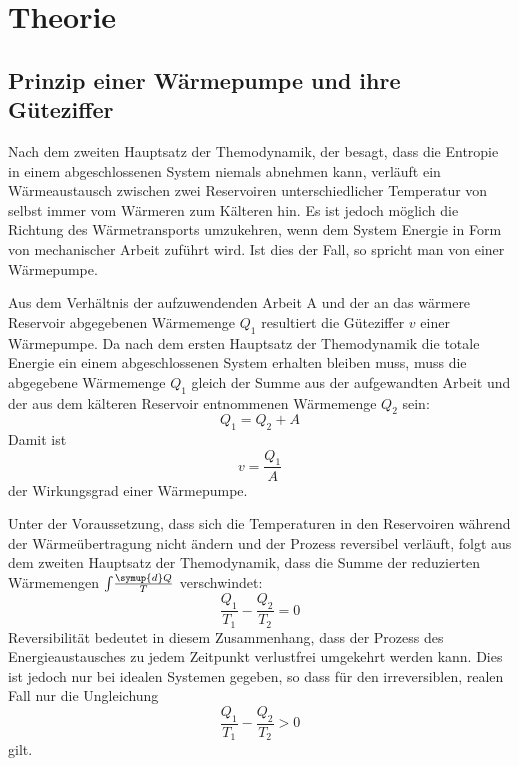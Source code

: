 \section{Theorie}
\label{sec:Theorie}
  \subsection{Prinzip einer Wärmepumpe und ihre Güteziffer}
  Nach dem zweiten Hauptsatz der Themodynamik, der besagt, dass die Entropie in
  einem abgeschlossenen System niemals abnehmen kann, verläuft ein Wärmeaustausch
  zwischen zwei Reservoiren unterschiedlicher Temperatur von selbst immer vom
  Wärmeren zum Kälteren hin.
  Es ist jedoch möglich die Richtung des Wärmetransports umzukehren, wenn dem
  System Energie in Form von mechanischer Arbeit zuführt wird. Ist dies der Fall,
  so spricht man von einer Wärmepumpe.

  Aus dem Verhältnis der aufzuwendenden Arbeit A und der an das wärmere Reservoir
  abgegebenen Wärmemenge $Q_1$ resultiert die Güteziffer $v$ einer Wärmepumpe.
  Da nach dem ersten Hauptsatz der Themodynamik die totale Energie ein einem
  abgeschlossenen System erhalten bleiben muss, muss die abgegebene Wärmemenge
  $Q_1$ gleich der Summe aus der aufgewandten Arbeit und der aus dem kälteren
  Reservoir entnommenen Wärmemenge $Q_2$ sein:
  \begin{equation}
    Q_1 = Q_2 + A
    \label{eqn:gl1}
  \end{equation}
  Damit ist
  \begin{equation}
    v = \frac{Q_1}{A}
    \label{eqn:gueteziffer1}
  \end{equation}
  der Wirkungsgrad einer Wärmepumpe.

  Unter der Voraussetzung, dass sich die Temperaturen in den Reservoiren während
  der Wärmeübertragung nicht ändern und der Prozess reversibel verläuft, folgt
  aus dem zweiten Hauptsatz der Themodynamik, dass die Summe der reduzierten
  Wärmemengen $\int \! \frac{\symup{d}Q}{T}$ verschwindet:
  \begin{equation}
    \frac{Q_1}{T_1} - \frac{Q_2}{T_2} = 0
    \label{eqn:gl3}
  \end{equation}
  Reversibilität bedeutet in diesem Zusammenhang, dass der Prozess des
  Energieaustausches zu jedem Zeitpunkt verlustfrei umgekehrt werden kann.
  Dies ist jedoch nur bei idealen Systemen gegeben, so dass für den irreversiblen,
  realen Fall nur die Ungleichung
  \begin{equation}
    \frac{Q_1}{T_1} - \frac{Q_2}{T_2} > 0
    \label{eqn:gl4}
  \end{equation}
  gilt.

